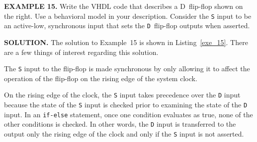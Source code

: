 \begin{leftbar}
\begin{minipage}{0.5\linewidth}
\noindent
\textbf{EXAMPLE 15.}
Write the VHDL code that describes a D~flip-flop shown on the right. Use a behavioral model in your description. Consider the \texttt{S} input to be an active-low, synchronous input that sets the \texttt{D}~flip-flop outputs when asserted.
\end{minipage}
\begin{minipage}{0.47\linewidth}
\begin{flushright}
\end{flushright}
\end{minipage}
\end{leftbar}
\noindent
\textbf{SOLUTION.} The solution to Example~15 is shown in Listing~\ref{exe_15}. There are a few things of interest regarding this solution.
\begin{my_list}
\item The \texttt{S} input to the flip-flop is made synchronous by only allowing it to affect the operation of the flip-flop on the rising edge of the system clock. 
\item On the rising edge of the clock, the \texttt{S} input takes precedence over the \texttt{D} input because the state of the \texttt{S} input is checked prior to examining the state of the \texttt{D} input. In an \texttt{if-else} statement, once one condition evaluates as true, none of the other conditions is checked. In other words, the \texttt{D} input is transferred to the output only the rising edge of the clock and only if the \texttt{S} input is not asserted.
\end{my_list}

